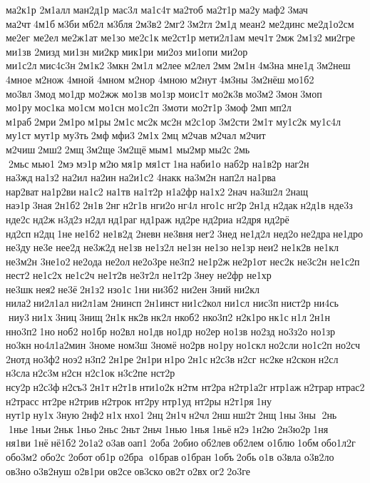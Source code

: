 ма2к1р 
2м1алл ман2д1р 	мас3л 
ма1с4т ма2тоб 
ма2т1р ма2у маф2 3мач 	ма2чт 4м1б м3би мб2л 	м3бля 2м3в2 2мг2 3м2гл 2м1д 	меан2 
ме2динс ме2д1о2см 	ме2ег 	ме2ел ме2ж1ат 	ме1зо 
ме2с1к ме2ст1р мети2л1ам 	меч1т 2мж 2м1з2 ми2гре 	ми1зв 	2мизд 	ми1зн 	ми2кр мик1ри 	ми2оз ми1опи 	ми2ор 
ми1с2л мис4с3н 2м1к2 3мкн 2м1л 	м2лее 	м2лел 2мм 2м1н 4м3на 	мне1д 
3м2неш 	4мное 	м2нож 	4мной 	4мном 	м2нор 	4мною 	м2нут 4м3ны 
3м2нёш мо1б2 	мо3вл 3мод 	мо1др 	мо2жж 	мо1зв 	мо1зр моис1т 
мо2к3в мо3м2 3мон 3моп 	мо1ру мос1ка 	мо1см 	мо1сн 
мо1с2п 	3моти 
мо2т1р 3моф 2мп мп2л 	м1раб 2мри 2м1ро м1ры 2м1с мс2к мс2н 
м2с1ор 
3м2сти 2м1т 
му1с2к 
му1с4л 	му1ст 	мут1р 	му3ть 2мф мфи3 2м1х 2мц 	м2чав 	м2чал 	м2чит 	м2чиш 2мш2 2мщ 3м2ще 3м2щё мым1 	мы2мр мы2с 2мь  2мьс мью1 2мэ мэ1р м2ю мя1р 	мя1ст 1на наби1о 	наб2р 
на1в2р 	наг2н 	на3жд на1з2 	на2ил 	на2ин на2и1с2 	4накк 
на3м2н 	нап2л на1рва 
нар2ват на1р2ви на1с2 	на1тв 
на1т2р 
н1а2фр на1х2 2нач 
на3ш2л 2нащ 	наэ1р 3ная 2н1б2 2н1в 2нг н2г1в 	нги2о нг4л 	нго1с нг2р 2н1д 	н2дак н2д1в 	нде3з 	нде2с нд2ж н3д2з н2дл нд1раг нд1раж 	нд2ре нд2риа 	н2дря 	нд2рё 	нд2сп н2дц 1не не1б2 
не1в2д 	2невн не3вня нег2 3нед 
не1д2л 	нед2о не2дра не1дро 	не3ду не3е 	нее2д 
не3ж2д 	не1зв 
не1з2л 	не1зн 	не1зо 	не1зр неи2 
не1к2в 	не1кл 
не3м2н 	3не1о2 не2ода 	не2ол не2о3ре не3п2 
не1р2ж не2р1от 	нес2к 
не3с2н 
не1с2п 	нест2 
не1с2х 
не1с2ч 
не1т2в 
не3т2л 
не1т2р 3неу 	не2фр 	не1хр 	не3шк нея2 не3ё 2н1з2 	нзо1с 1ни ни3б2 	ни2ен 3ний 	ни2кл 	нила2 ни2л1ал ни2л1ам 2нинсп 2н1инст ни1с2кол 	ни1сл 	нис3п нист2р 
ни4сь  ниу3 ни1х 3ниц 3нищ 2н1к нк2в нк2л 	нкоб2 
нко3п2 
н2к1ро нк1с н1л 2н1н 
нно3п2 1но ноб2 	но1бр 	но2вл 	но1дв 	но1др 	но2ер 	но1зв 	но2зд 
но3з2о 	но1зр 	но3кн но4л1а2мин 	3номе 	ном3ш 	3номё 	но2рв 	но1ру но1скл но2сли 
но1с2п 	но2сч 	2нотд но3ф2 ноэ2 н3п2 2н1ре 2н1ри н1ро 2н1с н2с3в н2сг 	нс2ке н2скон н2сл 	н3сла н2с3м н2сн 
н2с1ок 
н3с2пе 	нст2р 	нсу2р н2с3ф н2съ3 2н1т н2т1в нти1о2к н2тм 	нт2ра 
н2тр1а2г нтр1аж н2трар нтрас2 
н2трасс 	нт2ре н2трив н2трок 	нт2ру нтр1уд 	нт2ры 
н2т1ря 1ну 	нут1р ну1х 3ную 2нф2 н1х нхо1 2нц 2н1ч н2чл 2нш нш2т 2нщ 1ны 3ны  2нь  1нье 1ньи 2ньк 1ньо 2ньс 2ньт 2ньч 1нью 1нья 1ньё н2э 1н2ю 	2н3ю2р 1ня 	ня1ви 1нё нё1б2 2о1а2 о3ав оап1 2оба 	2обио об2лев об2лем 	о1блю 1обм обо1л2г 
обо3м2 	обо2с 	2обот об1р 
о2бра  о1брав о1бран 1объ 2обь о1в 	о3вла 
о3в2ло 	ов3но о3в2нуш 
о2в1ри 	ов2се ов3ско ов2т о2вх ог2 2о3ге 
